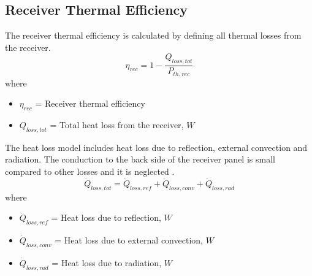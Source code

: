 \subsection{Receiver Thermal Efficiency}
The receiver thermal efficiency is calculated by defining all thermal losses from the receiver.
\begin{equation}
	\eta_{rec} = 1 - \frac{Q_{loss,tot}} {P_{th,rec}}
\end{equation}
where 
\begin{itemize}
	\item $\eta_{rec}$ = Receiver thermal efficiency
	\item $Q_{loss,tot}$ = Total heat loss from the receiver, $W$
\end{itemize}
The heat loss model includes heat loss due to reflection, external convection and radiation. The conduction to the back side of the receiver panel is small compared to other losses and it is neglected \cite{Stine.1985}.\\
\begin{equation}
\dot Q_{loss,tot} = \dot Q_{loss,ref}+ \dot Q_{loss,conv} + \dot Q_{loss,rad}
\end{equation}
where 
\begin{itemize}
	\item $\dot Q_{loss,ref}$ = Heat loss due to reflection, $W$
	\item $\dot Q_{loss,conv}$ = Heat loss due to external convection, $W$
	\item $\dot Q_{loss,rad}$ = Heat loss due to radiation, $W$
\end{itemize}

